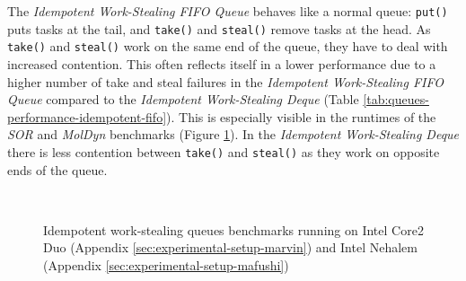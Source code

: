 The \emph{Idempotent Work-Stealing FIFO Queue} behaves like a normal
queue: \lstinline!put()! puts tasks at the tail, and
\lstinline!take()!  and \lstinline!steal()! remove tasks at the
head. As \lstinline!take()! and \lstinline!steal()! work on the same
end of the queue, they have to deal with increased contention. This
often reflects itself in a lower performance due to a higher number of
take and steal failures in the \emph{Idempotent Work-Stealing FIFO
  Queue} compared to the \emph{Idempotent Work-Stealing Deque} (Table
\ref{tab:queues-performance-idempotent-fifo}). This is especially
visible in the runtimes of the \emph{SOR} and \emph{MolDyn} benchmarks
(Figure \ref{fig:queues-performance-idempotent}). In the
\emph{Idempotent Work-Stealing Deque} there is less contention between
\lstinline!take()! and \lstinline!steal()! as they work on opposite
ends of the queue.

\begin{figure}[!htb]
  \centering
  \\
  \caption[Idempotent work-stealing queues]{Idempotent work-stealing
    queues benchmarks running on Intel Core2 Duo (Appendix
    \ref{sec:experimental-setup-marvin}) and Intel Nehalem (Appendix
    \ref{sec:experimental-setup-mafushi})}
  \label{fig:queues-performance-idempotent}
\end{figure}


